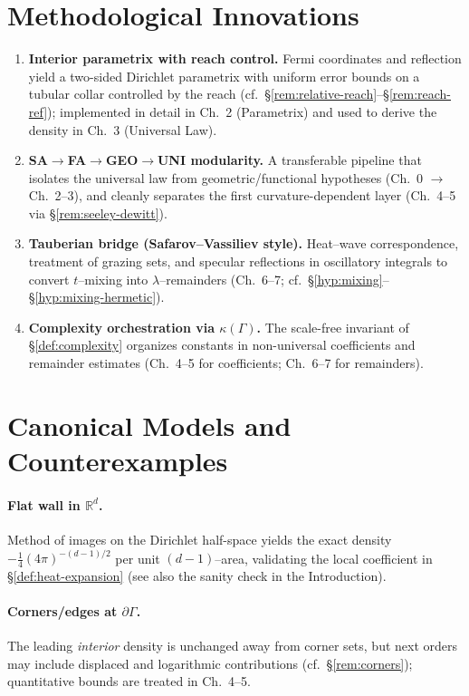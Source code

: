 \section{Methodological Innovations}\label{sec:methods-innovation}
\begin{enumerate}
  \item \textbf{Interior parametrix with reach control.}
  Fermi coordinates and reflection yield a two-sided Dirichlet parametrix with uniform error bounds on a tubular collar controlled by the reach (cf.\ \S\ref{rem:relative-reach}–\S\ref{rem:reach-ref}); implemented in detail in Ch.~2 (Parametrix) and used to derive the density in Ch.~3 (Universal Law).
  \item \textbf{SA$\to$FA$\to$GEO$\to$UNI modularity.}
  A transferable pipeline that isolates the universal law from geometric/functional hypotheses (Ch.~0 $\to$ Ch.~2–3), and cleanly separates the first curvature-dependent layer (Ch.~4–5 via \S\ref{rem:seeley-dewitt}).
  \item \textbf{Tauberian bridge (Safarov–Vassiliev style).}
  Heat–wave correspondence, treatment of grazing sets, and specular reflections in oscillatory integrals to convert $t$–mixing into $\lambda$–remainders (Ch.~6–7; cf.\ \S\ref{hyp:mixing}–\S\ref{hyp:mixing-hermetic}).
  \item \textbf{Complexity orchestration via $\kappa(\Gamma)$.}
  The scale-free invariant of \S\ref{def:complexity} organizes constants in non-universal coefficients and remainder estimates (Ch.~4–5 for coefficients; Ch.~6–7 for remainders).
\end{enumerate}

\medskip

\section{Canonical Models and Counterexamples}\label{sec:models-counter}

\paragraph{Flat wall in $\mathbb{R}^d$.}
Method of images on the Dirichlet half-space yields the exact density $-\frac14(4\pi)^{-(d-1)/2}$ per unit $(d\!-\!1)$–area, validating the local coefficient in \S\ref{def:heat-expansion} (see also the sanity check in the Introduction).

\paragraph{Corners/edges at $\partial\Gamma$.}
The leading \emph{interior} density is unchanged away from corner sets, but next orders may include displaced and logarithmic contributions (cf.\ \S\ref{rem:corners}); quantitative bounds are treated in Ch.~4–5.

